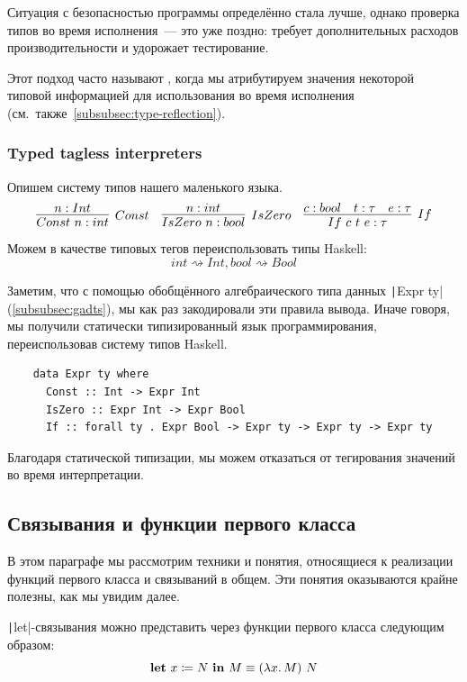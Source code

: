 Ситуация с безопасностью программы определённо стала лучше, однако проверка типов во время исполнения~--- это уже поздно: требует дополнительных расходов производительности и удорожает тестирование.

Этот подход часто называют , когда мы атрибутируем значения некоторой типовой информацией для использования во время исполнения (см.\ также\ \ref{subsubsec:type-reflection}).

\subsubsection{Typed tagless interpreters} \label{subsubsec:typed-tagless-initial}

Опишем систему типов нашего маленького языка.
\begin{equation*}{}
    \infer[Const]{Const~n : int}{n : Int}
    \quad
    \infer[IsZero]{IsZero~n : bool}{n : int}
    \quad
    \infer[If]{If~c~t~e : \tau}{c : bool & t : \tau & e : \tau}
\end{equation*}
Можем в качестве типовых тегов переиспользовать типы Haskell: \[int \rightsquigarrow Int, bool \rightsquigarrow Bool\]

Заметим, что с помощью обобщённого алгебраического типа данных \texttt|Expr ty| (\ref{subsubsec:gadts}), мы как раз закодировали эти правила вывода.
Иначе говоря, мы получили статически типизированный язык программирования, переиспользовав систему типов Haskell.
\begin{verbatim}
    data Expr ty where
      Const :: Int -> Expr Int
      IsZero :: Expr Int -> Expr Bool
      If :: forall ty . Expr Bool -> Expr ty -> Expr ty -> Expr ty
\end{verbatim}

Благодаря статической типизации, мы можем отказаться от тегирования значений во время интерпретации.

\subsection{Связывания и функции первого класса} \label{subsec:first-class-functions}

В этом параграфе мы рассмотрим техники и понятия, относящиеся к реализации функций первого класса и связываний в общем.
Эти понятия оказываются крайне полезны, как мы увидим далее.

\texttt|let|-связывания можно представить через функции первого класса следующим образом:
\[
    \mathbf{let} ~ x \coloneqq N ~ \mathbf{in} ~ M \equiv (\lambda x\ldotp M) ~ N
\]

